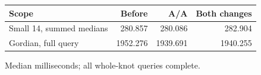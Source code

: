 \begin{center}\small
\begin{tabular}{@{}lrrr@{}}
\toprule
Scope & Before & A/A & Both changes \\
\midrule
Small 14, summed medians & 280.857 & 280.086 & 282.904 \\
Gordian, full query & 1952.276 & 1939.691 & 1940.255 \\
\bottomrule
\end{tabular}
\end{center}
Median milliseconds; all whole-knot queries complete.
